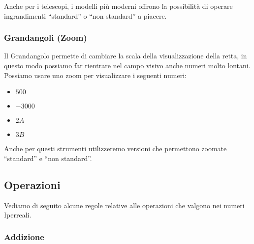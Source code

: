 Anche per i telescopi, i modelli più moderni offrono la possibilità di operare 
ingrandimenti ``standard'' o ``non standard'' a piacere.

\subsubsection{Grandangoli (Zoom)}
\label{subsec:insnum_microscopio}

Il Grandangolo permette di cambiare la scala della visualizzazione della retta, 
in questo modo possiamo far rientrare nel campo visivo anche numeri molto 
lontani.
Possiamo usare uno zoom per visualizzare i seguenti numeri:

\begin{multicols}{4}
\begin{itemize}
 \item $500$
 \item $-3000$
 \item $2A$
 \item $3B$
\end{itemize}
\end{multicols}

Anche per questi strumenti utilizzeremo versioni che permettono zoomate 
``standard'' e ``non standard''.

\subsection{Operazioni}
\label{subsec:insnum_operazioni}

Vediamo di seguito alcune regole relative alle operazioni 
che valgono nei numeri Iperreali.

\subsubsection{Addizione}
\label{subsec:insnum_addizione}

